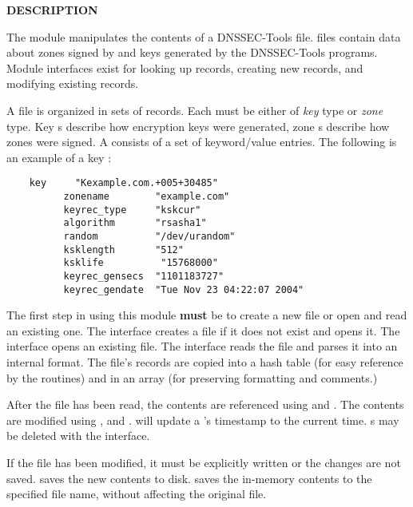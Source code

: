 {\bf DESCRIPTION}

The  module manipulates the contents of
a DNSSEC-Tools  file.   files contain data about
zones signed by and keys generated by the DNSSEC-Tools programs.  Module
interfaces exist for looking up  records, creating new records,
and modifying existing records.

A  file is organized in sets of  records.  Each
 must be either of {\it key} type or {\it zone} type.  Key
s describe how encryption keys were generated, zone
s describe how zones were signed.  A  consists
of a set of keyword/value entries.  The following is an example of a key
:

\begin{verbatim}
    key     "Kexample.com.+005+30485"
          zonename        "example.com"
          keyrec_type     "kskcur"
          algorithm       "rsasha1"
          random          "/dev/urandom"
          ksklength       "512"
          ksklife          "15768000"
          keyrec_gensecs  "1101183727"
          keyrec_gendate  "Tue Nov 23 04:22:07 2004"
\end{verbatim}

The first step in using this module {\bf must} be to create a new
 file or open and read an existing one.  The
 interface creates a  file if it does not
exist and opens it.  The  interface opens an existing
 file.  The  interface reads the file and
parses it into an internal format. The file's records are copied into a hash
table (for easy reference by the  routines)
and in an array (for preserving formatting and comments.)

After the file has been read, the contents are referenced using
 and .  The 
contents are modified using , and .
 will update a 's timestamp to the
current time.  s may be deleted with the 
interface.

If the  file has been modified, it must be explicitly written
or the changes are not saved.   saves the new contents
to disk.   saves the in-memory  contents
to the specified file name, without affecting the original file.

